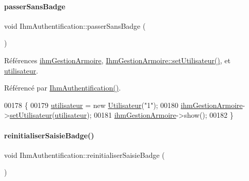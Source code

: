 \paragraph{\texorpdfstring{passer\+Sans\+Badge}{passerSansBadge}}
{\footnotesize\ttfamily void Ihm\+Authentification\+::passer\+Sans\+Badge (\begin{DoxyParamCaption}{ }\end{DoxyParamCaption})\hspace{0.3cm}{\ttfamily [slot]}}



Références \hyperlink{class_ihm_authentification_a6ce06a3dbea8b929c3ddffdba011c01f}{ihm\+Gestion\+Armoire}, \hyperlink{class_ihm_gestion_armoire_af63a0c4424edd90a3c45506dde527b4e}{Ihm\+Gestion\+Armoire\+::set\+Utilisateur()}, et \hyperlink{class_ihm_authentification_ad08cee96c59182c27198907491f0c963}{utilisateur}.



Référencé par \hyperlink{class_ihm_authentification_a09e60cbdf8d1377e17d940463acb75ba}{Ihm\+Authentification()}.


\begin{DoxyCode}
00178 \{
00179     \hyperlink{class_ihm_authentification_ad08cee96c59182c27198907491f0c963}{utilisateur} = \textcolor{keyword}{new} \hyperlink{class_utilisateur}{Utilisateur}(\textcolor{stringliteral}{"1"});
00180     \hyperlink{class_ihm_authentification_a6ce06a3dbea8b929c3ddffdba011c01f}{ihmGestionArmoire}->\hyperlink{class_ihm_gestion_armoire_af63a0c4424edd90a3c45506dde527b4e}{setUtilisateur}(\hyperlink{class_ihm_authentification_ad08cee96c59182c27198907491f0c963}{utilisateur});
00181     \hyperlink{class_ihm_authentification_a6ce06a3dbea8b929c3ddffdba011c01f}{ihmGestionArmoire}->show();
00182 \}
\end{DoxyCode}
\mbox{\label{class_ihm_authentification_afa429a3de1da16117b7ce4c9d8f40160}} 
\paragraph{\texorpdfstring{reinitialiser\+Saisie\+Badge()}{reinitialiserSaisieBadge()}}
{\footnotesize\ttfamily void Ihm\+Authentification\+::reinitialiser\+Saisie\+Badge (\begin{DoxyParamCaption}{ }\end{DoxyParamCaption})\hspace{0.3cm}{\ttfamily [private]}}



